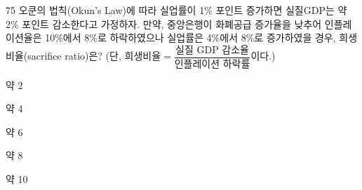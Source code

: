 \begin{question}{75}
오쿤의 법칙(Okun's Law)에 따라 실업률이 1\% 포인트 증가하면 실질GDP는 약 2\% 포인트 감소한다고 가정하자. 만약, 중앙은행이 화폐공급 증가율을 낮추어 인플레이션율은 10\%에서 8\%로 하락하였으나 실업률은 4\%에서 8\%로 증가하였을 경우, 희생비율(sacrifice ratio)은?
(단, 희생비율$=\dfrac{\text{실질 GDP 감소율}}{\text{인플레이션 하락률}}$이다.)
\begin{choices}
  \item 약 2
  \item 약 4
  \item 약 6
  \item 약 8
  \item 약 10
\end{choices}
\end{question}
